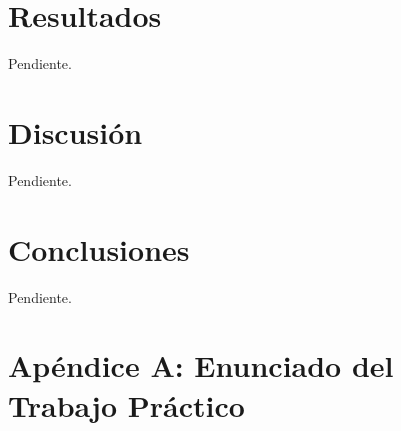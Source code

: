 \documentclass[a4paper,10pt,twoside]{article}
\begin{document}







\section{Resultados}
Pendiente.



\section{Discusión}
Pendiente.



\section{Conclusiones}
Pendiente.


\newpage

\section{Apéndice A: Enunciado del Trabajo Práctico}

\end{document}
